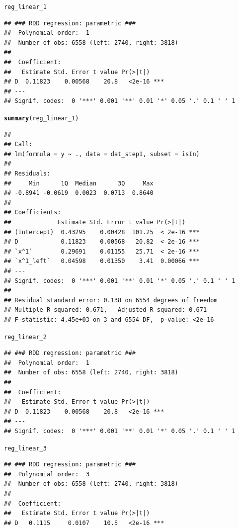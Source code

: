 \documentclass[english,nojss]{jss}\usepackage{graphicx, color}
\makeatletter
\newcommand{\hlfunctioncall}[1]{\textcolor[rgb]{0.501960784313725,0,0.329411764705882}{\textbf{#1}}}%
\newenvironment{kframe}{%
 \def\at@end@of@kframe{}%
 \ifinner\ifhmode%
  \def\at@end@of@kframe{\end{minipage}}%
  \begin{minipage}{\columnwidth}%
 \fi\fi%
 \def\FrameCommand##1{\hskip\@totalleftmargin \hskip-\fboxsep
 \colorbox{shadecolor}{##1}\hskip-\fboxsep
     \hskip-\linewidth \hskip-\@totalleftmargin \hskip\columnwidth}%
 \MakeFramed {\advance\hsize-\width
   \@totalleftmargin\z@ \linewidth\hsize
   \@setminipage}}%
 {\par\unskip\endMakeFramed%
 \at@end@of@kframe}
\newenvironment{knitrout}{}{} %
\makeatother
\begin{document}
\begin{knitrout}
\color{fgcolor}\begin{kframe}
\begin{alltt}
reg_linear_1
\end{alltt}
\begin{verbatim}
## ### RDD regression: parametric ###
## 	Polynomial order:  1 
## 	Number of obs: 6558 (left: 2740, right: 3818)
## 
## 	Coefficient:
##   Estimate Std. Error t value Pr(>|t|)    
## D  0.11823    0.00568    20.8   <2e-16 ***
## ---
## Signif. codes:  0 '***' 0.001 '**' 0.01 '*' 0.05 '.' 0.1 ' ' 1
\end{verbatim}
\begin{alltt}
\hlfunctioncall{summary}(reg_linear_1)
\end{alltt}
\begin{verbatim}
## 
## Call:
## lm(formula = y ~ ., data = dat_step1, subset = isIn)
## 
## Residuals:
##     Min      1Q  Median      3Q     Max 
## -0.8941 -0.0619  0.0023  0.0713  0.8640 
## 
## Coefficients:
##             Estimate Std. Error t value Pr(>|t|)    
## (Intercept)  0.43295    0.00428  101.25  < 2e-16 ***
## D            0.11823    0.00568   20.82  < 2e-16 ***
## `x^1`        0.29691    0.01155   25.71  < 2e-16 ***
## `x^1_left`   0.04598    0.01350    3.41  0.00066 ***
## ---
## Signif. codes:  0 '***' 0.001 '**' 0.01 '*' 0.05 '.' 0.1 ' ' 1 
## 
## Residual standard error: 0.138 on 6554 degrees of freedom
## Multiple R-squared: 0.671,	Adjusted R-squared: 0.671 
## F-statistic: 4.45e+03 on 3 and 6554 DF,  p-value: <2e-16
\end{verbatim}
\begin{alltt}
reg_linear_2
\end{alltt}
\begin{verbatim}
## ### RDD regression: parametric ###
## 	Polynomial order:  1 
## 	Number of obs: 6558 (left: 2740, right: 3818)
## 
## 	Coefficient:
##   Estimate Std. Error t value Pr(>|t|)    
## D  0.11823    0.00568    20.8   <2e-16 ***
## ---
## Signif. codes:  0 '***' 0.001 '**' 0.01 '*' 0.05 '.' 0.1 ' ' 1
\end{verbatim}
\begin{alltt}
reg_linear_3
\end{alltt}
\begin{verbatim}
## ### RDD regression: parametric ###
## 	Polynomial order:  3 
## 	Number of obs: 6558 (left: 2740, right: 3818)
## 
## 	Coefficient:
##   Estimate Std. Error t value Pr(>|t|)    
## D   0.1115     0.0107    10.5   <2e-16 ***

\end{verbatim}
\end{kframe}
\end{knitrout}
\end{document}
